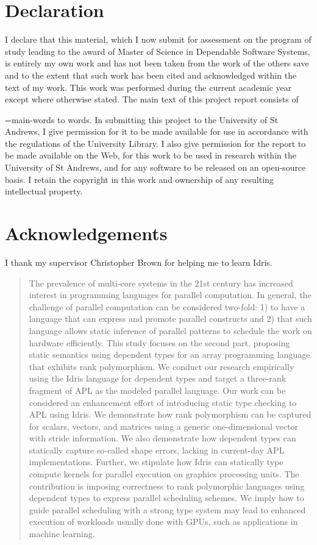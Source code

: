 \documentclass{report}
\makeatletter
\newcommand{\quickwordcount}[1]{%
  \immediate\write18{texcount -1 -sum -merge #1.tex > #1-words}%
  \immediate\openin\somefile=#1-words%
  \read\somefile to \@@localdummy%
  \immediate\closein\somefile%
  \setcounter{wordcounter}{\@@localdummy}%
  \@@localdummy%
}
\makeatother
\begin{document}
\section*{Declaration}

I declare that this material, which I now submit for assessment on the program of study leading to the award of Master of Science in Dependable Software Systems, is entirely my own work and has not been taken from the work of the others save and to the extent that such work has been cited and acknowledged within the text of my work. This work was performed during the current academic year except where otherwise stated. The main text of this project report consists of \quickwordcount{main} words. In submitting this project to the University of St Andrews, I give permission for it to be made available for use in accordance with the regulations of the University Library. I also give permission for the report to be made available on the Web, for this work to be used in research within the University of St Andrews, and for any software to be released on an open-source basis. I retain the copyright in this work and ownership of any resulting intellectual property.

\section*{Acknowledgements}

I thank my supervisor Christopher Brown for helping me to learn Idris.

\begin{abstract}

The prevalence of multi-core systems in the 21st century has increased interest in programming languages for parallel computation. In general, the challenge of parallel computation can be considered two-fold: 1) to have a language that can express and promote parallel constructs and 2) that such language allows static inference of parallel patterns to schedule the work on hardware efficiently. This study focuses on the second part, proposing static semantics using dependent types for an array programming language that exhibits rank polymorphism. We conduct our research empirically using the Idris language for dependent types and target a three-rank fragment of APL as the modeled parallel language. Our work can be considered an enhancement effort of introducing static type checking to APL using Idris. We demonstrate how rank polymorphism can be captured for scalars, vectors, and matrices using a generic one-dimensional vector with stride information. We also demonstrate how dependent types can statically capture so-called shape errors, lacking in current-day APL implementations. Further, we stipulate how Idris can statically type compute kernels for parallel execution on graphics processing units. The contribution is imposing correctness to rank polymorphic languages using dependent types to express parallel scheduling schemes. We imply how to guide parallel scheduling with a strong type system may lead to enhanced execution of workloads usually done with GPUs, such as applications in machine learning.

\end{abstract}
\end{document}
